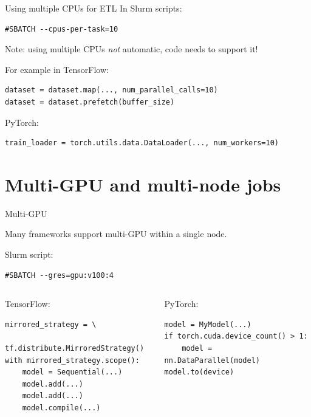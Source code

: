 \documentclass[aspectratio=1610,14pt]{beamer}
\begin{document}
\begin{frame}[fragile]{Using multiple CPUs for ETL}
  In Slurm scripts:
\begin{verbatim}
#SBATCH --cpus-per-task=10
\end{verbatim}

\vspace{0.5em}

\alert{Note:} using multiple CPUs \emph{not} automatic, code needs to support it!

\vspace{0.5em}

  For example in TensorFlow:

\begin{verbatim}
dataset = dataset.map(..., num_parallel_calls=10)
dataset = dataset.prefetch(buffer_size)
\end{verbatim}

  PyTorch:

\begin{verbatim}
train_loader = torch.utils.data.DataLoader(..., num_workers=10)
\end{verbatim}
\end{frame}

\section{Multi-GPU and multi-node jobs}

\begin{frame}[fragile]{Multi-GPU}

  Many frameworks support multi-GPU within a single node.

  \vspace{0.5em}
  
  Slurm script:
  \begin{verbatim}
#SBATCH --gres=gpu:v100:4
  \end{verbatim}

  \vspace{0.5em}
  
  \begin{columns}[t]
    \begin{column}{0.47\linewidth}
      TensorFlow:
      
      \begin{verbatim}
mirrored_strategy = \
  tf.distribute.MirroredStrategy()
with mirrored_strategy.scope():
    model = Sequential(...)
    model.add(...)
    model.add(...)
    model.compile(...)
      \end{verbatim}
    \end{column}
    \begin{column}{0.47\linewidth}
      PyTorch:
      
      \begin{verbatim}
model = MyModel(...)
if torch.cuda.device_count() > 1:
    model = nn.DataParallel(model)
model.to(device)
      \end{verbatim}
    \end{column}
  \end{columns}
\end{frame}
\end{document}
